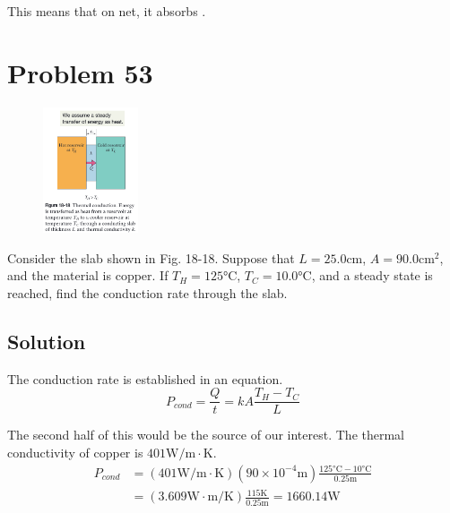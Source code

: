 \documentclass[12pt]{article}
\begin{document}
            This means that on net, it absorbs \boxed{1047.112 \unit{\watt}}. 


    \pagebreak
    \section{Problem 53}
        \begin{figure}
            \vspace{-30pt}
            \includegraphics[width=0.25\textwidth]{picture_18-18.png} 
        \end{figure}
        Consider the slab shown in Fig. 18-18. 
        Suppose that $L = 25.0 \unit{\centi\meter}$, $A = 90.0 \unit{\centi\meter^2}$, and the material is copper. 
        If $T_H = 125\unit{\celsius}$, $T_C = 10.0\unit{\celsius}$, and a steady state is reached, find the conduction rate through the slab.

        \subsection{Solution}
            The conduction rate is established in an equation.
            \begin{equation}
                P_{cond} = \frac{Q}{t} = kA \frac{T_H - T_C}{L}
            \end{equation}

            The second half of this would be the source of our interest.
            The thermal conductivity of copper is $401 \unit{\watt/\meter\cdot\kelvin}$.
            \begin{align}
                P_{cond}    &=  (401 \unit{\watt/\meter\cdot\kelvin}) (90 \times 10^{-4} \unit{\meter}) \frac{125 \unit{\celsius} - 10 \unit{\celsius}}{0.25 \unit{\meter}}\\
                    &=  (3.609 \unit{\watt\cdot\meter/\kelvin})\frac{115\unit{\kelvin}}{0.25\unit{\meter}}
                    =   \boxed{1660.14 \unit{\watt}}
            \end{align}
            
\end{document}
